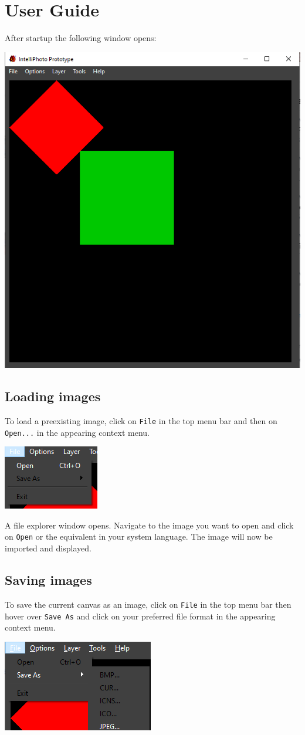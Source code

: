 \documentclass[a4paper, 12pt]{article}
\begin{document}
\section{User Guide}
After startup the following window opens:
\begin{center}
\includegraphics[width=0.55\linewidth,keepaspectratio]{assets/startup}
\end{center}

\subsection{Loading images}
To load a preexisting image, click on \texttt{File} in the top menu bar and then on \texttt{Open...} in the appearing context menu.
\begin{center}
\includegraphics[width=0.3\linewidth,keepaspectratio]{assets/file-open}
\end{center}

A file explorer window opens. Navigate to the image you want to open and click on \texttt{Open} or the equivalent in your system language. The image will now be imported and displayed.

\subsection{Saving images}
To save the current canvas as an image, click on \texttt{File} in the top menu bar then hover over \texttt{Save As} and click on your preferred file format in the appearing context menu.
\begin{center}
\includegraphics[width=0.3\linewidth,keepaspectratio]{assets/file-save}
\end{center}
\end{document}
